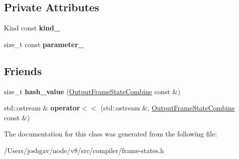 \subsection*{Private Attributes}
\begin{DoxyCompactItemize}
\item 
Kind const {\bfseries kind\+\_\+}\hypertarget{classv8_1_1internal_1_1compiler_1_1_output_frame_state_combine_a8156e407ac921fcd1eaeba72fb9b5b9f}{}\label{classv8_1_1internal_1_1compiler_1_1_output_frame_state_combine_a8156e407ac921fcd1eaeba72fb9b5b9f}

\item 
size\+\_\+t const {\bfseries parameter\+\_\+}\hypertarget{classv8_1_1internal_1_1compiler_1_1_output_frame_state_combine_a2eb32b91e71a6229c4bc2c192c6ff599}{}\label{classv8_1_1internal_1_1compiler_1_1_output_frame_state_combine_a2eb32b91e71a6229c4bc2c192c6ff599}

\end{DoxyCompactItemize}
\subsection*{Friends}
\begin{DoxyCompactItemize}
\item 
size\+\_\+t {\bfseries hash\+\_\+value} (\hyperlink{classv8_1_1internal_1_1compiler_1_1_output_frame_state_combine}{Output\+Frame\+State\+Combine} const \&)\hypertarget{classv8_1_1internal_1_1compiler_1_1_output_frame_state_combine_a8e824751974d5c56479b21a7aefeceba}{}\label{classv8_1_1internal_1_1compiler_1_1_output_frame_state_combine_a8e824751974d5c56479b21a7aefeceba}

\item 
std\+::ostream \& {\bfseries operator$<$$<$} (std\+::ostream \&, \hyperlink{classv8_1_1internal_1_1compiler_1_1_output_frame_state_combine}{Output\+Frame\+State\+Combine} const \&)\hypertarget{classv8_1_1internal_1_1compiler_1_1_output_frame_state_combine_ae57755b6944618f08876a213d0b47c1b}{}\label{classv8_1_1internal_1_1compiler_1_1_output_frame_state_combine_ae57755b6944618f08876a213d0b47c1b}

\end{DoxyCompactItemize}


The documentation for this class was generated from the following file\+:\begin{DoxyCompactItemize}
\item 
/\+Users/joshgav/node/v8/src/compiler/frame-\/states.\+h\end{DoxyCompactItemize}
